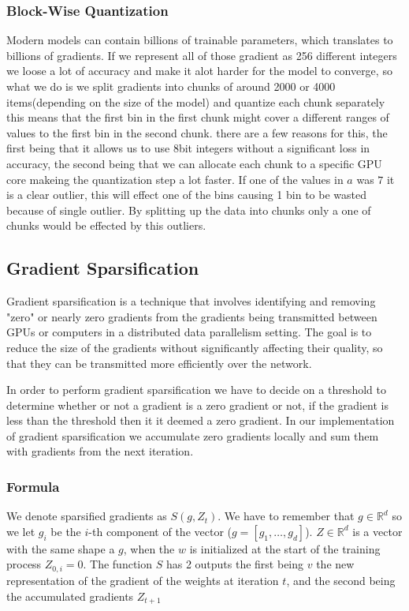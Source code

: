 \documentclass[11pt]{article}
\begin{document}
\subsubsection{Block-Wise Quantization}

Modern models can contain billions of trainable parameters, which translates to billions of gradients. If we represent all of those gradient as 256 different integers we loose a lot of accuracy and make it alot harder for the model to converge, so what we do is we split gradients into chunks of around 2000 or 4000 items(depending on the size of the model) and quantize each chunk separately this means that the first bin in the first chunk might cover a different ranges of values to the first bin in the second chunk. there are a few reasons for this, the first being that it allows us to use 8bit integers without a significant loss in accuracy, the second being that we can allocate each chunk to a specific GPU core makeing the quantization step a lot faster. If one of the values in $a$ was $7$ it is a clear outlier, this will effect one of the bins causing 1 bin to be wasted because of single outlier. By splitting up the data into chunks only a one of chunks would be effected by this outliers.


\subsection{Gradient Sparsification}
Gradient sparsification is a technique that involves identifying and removing "zero" or nearly zero gradients from the gradients being transmitted between GPUs or computers in a distributed data parallelism setting. The goal is to reduce the size of the gradients without significantly affecting their quality, so that they can be transmitted more efficiently over the network.

In order to perform gradient sparsification we have to decide on a threshold to determine whether or not a gradient is a zero gradient or not, if the gradient is less than the threshold then it it deemed a zero gradient. In our implementation of gradient sparsification we accumulate zero gradients locally and sum them with gradients from the next iteration. 

\subsubsection{Formula}
We denote sparsified gradients as $S(g, Z_t)$. We have to remember that $g \in \mathbb{R}^d$ so we let $g_i$ be the $i$-th component of the vector ($g=[g_1,\ldots,g_d]$). $Z \in \mathbb{R}^d$ is a vector with the same shape a $g$, when the $w$ is initialized at the start of the training process $Z_{0,i} = 0$. The function $S$ has 2 outputs the first being $v$ the new representation of the gradient of the weights at iteration $t$, and the second being the accumulated gradients $Z_{t+1}$
\end{document}
